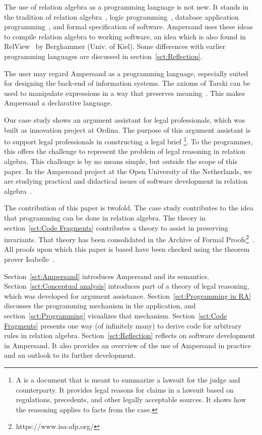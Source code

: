 \documentclass{svproc}
\begin{document}
	The use of relation algebra as a programming language is not new.
	It stands in the tradition of relation algebra~\cite{Maddux06}, logic programming~\cite{Lloyd1984},
	database application programming~\cite{Codd70}, and formal specification of software.
	Ampersand uses these ideas to compile relation algebra to working software, an idea which is also found in RelView~\cite{Berghammer2005} by Berghammer (Univ. of Kiel).
	Some differences with earlier programming languages are discussed in section~\ref{sct:Reflection}.
	
	The user may regard Ampersand as a programming language, especially suited for designing the back-end of information systems.
	The axioms of Tarski can be used to manipulate expressions in a way that preserves meaning~\cite{vdWoude2011}.
	This makes Ampersand a declarative language.

	Our case study shows an argument assistant for legal professionals, which was built as innovation project at Ordina.
	The purpose of this argument assistant is to support legal professionals in constructing a legal brief%
\footnote{A  is a document that is meant to summarize a lawsuit for the judge and counterparty.
	It provides legal reasons for claims in a lawsuit based on regulations, precedents, and other legally acceptable sources.
	It shows how the reasoning applies to facts from the case.}.
	To the programmer, this offers the challenge to represent the problem of legal reasoning in relation algebra.
	This challenge is by no means simple, but outside the scope of this paper.
	In the Ampersand project at the Open University of the Netherlands,
	we are studying practical and didactical issues of software development in relation algebra~\cite{Michels2015}.

	The contribution of this paper is twofold.
	The case study contributes to the idea that programming can be done in relation algebra.
	The theory in section~\ref{sct:Code Fragments} contributes a theory to assist in preserving invariants.
	That theory has been consolidated in the Archive of Formal Proofs\footnote{https://www.isa-afp.org/}~\cite{Joosten-AFP17}.
	All proofs upon which this paper is based have been checked using the theorem prover Isabelle~\cite{Nipkow2002}.

	Section~\ref{sct:Ampersand} introduces Ampersand and its semantics.
	Section~\ref{sct:Conceptual analysis} introduces part of a theory of legal reasoning,
	which was developed for argument assistance.
	Section~\ref{sct:Programming in RA} discusses the programming mechanism in the application,
	and section~\ref{sct:Programming} visualizes that mechanism.
	Section~\ref{sct:Code Fragments} presents one way (of infinitely many) to derive code for arbitrary rules in relation algebra.
	Section~\ref{sct:Reflection} reflects on software development in Ampersand.
	It also provides an overview of the use of Ampersand in practice and an outlook to its further development.
\end{document}

